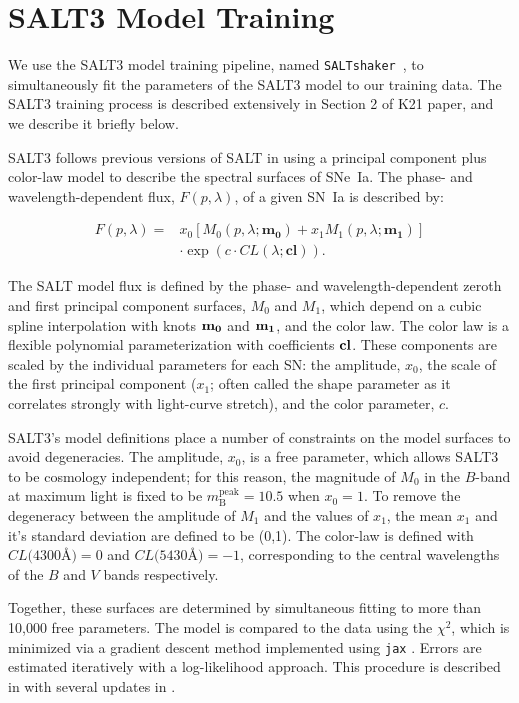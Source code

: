 \documentclass[twocolumn,tighten,times,floatfix]{aastex631}
\newcommand{\saltshaker}{\texttt{SALTshaker}}
\begin{document}
\section{SALT3 Model Training} \label{sec:training}


We use the SALT3 model training pipeline, named \saltshaker\ \citep{kenworthy_salt3_2021}, to simultaneously fit the parameters of the SALT3 model to our training data.  The SALT3 training process is described extensively in Section 2 of K21 paper, and we describe it briefly below.

SALT3 follows previous versions of SALT in using a principal component plus color-law model to describe the spectral surfaces of SNe~Ia.  The phase- and wavelength-dependent flux, $F(p,\lambda)$, of a given SN~Ia is described by:

\begin{align}
        F(p,\lambda) = &x_0 [M_0(p,\lambda;\boldsymbol{m_0}) + x_1 M_1(p,\lambda;\boldsymbol{m_1})] \nonumber\\ & \cdot \exp(c \cdot CL(\lambda;\boldsymbol{cl})).    
\end{align}

\noindent The SALT model flux is defined by the phase- and wavelength-dependent zeroth and first principal component surfaces, $M_0$ and $M_1$, which depend on a cubic spline interpolation with knots ${\bf m_0}$ and ${\bf m_1}$, and the color law.  The color law is a flexible polynomial parameterization with coefficients ${\bf cl}$.  These components are scaled by the individual parameters for each SN: the amplitude, $x_0$, the scale of the first principal component ($x_1$; often called the shape parameter as it correlates strongly with light-curve stretch), and the color parameter, $c$.

SALT3's model definitions place a number of constraints on the model surfaces to avoid degeneracies. The amplitude, $x_0$, is a free parameter, which allows SALT3 to be cosmology independent; for this reason, the magnitude of $M_0$ in the $B$-band at maximum light is fixed to be $m_\textrm{B}^\textrm{peak}=10.5$ when $x_0=1$.  To remove the degeneracy between the amplitude of $M_1$ and the values of $x_1$, the mean $x_1$ and it's standard deviation are defined to be (0,1). The color-law is defined with $CL(4300$\AA$) = 0$ and $CL(5430$\AA$) = -1$, corresponding to the central wavelengths of the $B$ and $V$ bands respectively. 


Together, these surfaces are determined by simultaneous fitting to more than 10,000 free parameters.  The model is compared to the data using the $\chi^2$, which is minimized via a gradient descent method implemented using {\tt jax} \citep{jax2018github}.  Errors are estimated iteratively with a log-likelihood approach.  This procedure is described in \citet{kenworthy_salt3_2021} with several updates in \citet{Kenworthy25}.
\end{document}

